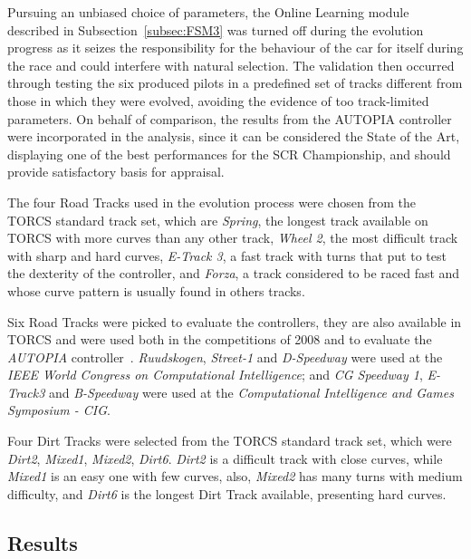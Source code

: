 	Pursuing an unbiased choice of parameters, the Online Learning module described in Subsection~\ref{subsec:FSM3} was turned off during the evolution progress as it seizes the responsibility for the behaviour of the car for itself during the race and could interfere with natural selection. The validation then occurred through testing the six produced pilots in a predefined set of tracks different from those in which they were evolved, avoiding the evidence of too track-limited parameters. On behalf of comparison, the results from the AUTOPIA controller were incorporated in the analysis, since it can be considered the State of the Art, displaying one of the best performances for the SCR Championship, and should provide satisfactory basis for appraisal.

	The four Road Tracks used in the evolution process were chosen from the TORCS standard track set, which are \emph{Spring}, the longest track available on TORCS with more curves than any other track, \emph{Wheel 2}, the most difficult track with sharp and hard curves, \emph{E-Track 3}, a fast track with turns that put to test the dexterity of the controller, and \emph{Forza}, a track considered to be raced fast and whose curve pattern is usually found in others tracks.

	Six Road Tracks were picked to evaluate the controllers, they are also available in TORCS and were used both in the competitions of 2008 and to evaluate the \emph{AUTOPIA} controller~\cite{AUTOPIA2009}. \emph{Ruudskogen}, \emph{Street-1} and \emph{D-Speedway} were used at the \emph{IEEE World Congress on Computational Intelligence}; and \emph{CG Speedway 1}, \emph{E-Track3} and \emph{B-Speedway} were used at the \emph{Computational Intelligence and Games Symposium - CIG}.

	Four Dirt Tracks were selected from the TORCS standard track set, which were \emph{Dirt2}, \emph{Mixed1}, \emph{Mixed2}, \emph{Dirt6}. \emph{Dirt2} is a difficult track with close curves, while \emph{Mixed1} is an easy one with few curves, also, \emph{Mixed2} has many turns with medium difficulty, and \emph{Dirt6} is the longest Dirt Track available, presenting hard curves.
	
\subsection{Results} \label{subsec:Results}
	
	

